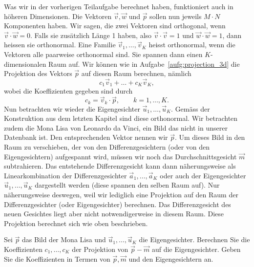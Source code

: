 Was wir in der vorherigen Teilaufgabe berechnet haben, funktioniert auch in höheren Dimensionen.
Die Vektoren $\vec v,\vec w$ und $\vec p$ sollen nun jeweils $M\cdot N$ Komponenten haben.
Wir sagen, die zwei Vektoren sind orthogonal, wenn $\vec v\cdot\vec w=0$.
Falls sie zusätzlich Länge 1 haben, also $\vec v\cdot\vec v=1$ und $\vec w\cdot\vec w=1$, dann heissen sie orthonormal.
Eine Familie $\vec v_1,\ldots,\vec v_K$ heisst orthonormal, wenn die Vektoren alle paarweise orthonormal sind.
Sie spannen dann einen $K$-dimensionalen Raum auf.
Wir können wie in Aufgabe~\ref{aufg:projection_3d} die Projektion des Vektors $\vec p$ auf diesen Raum berechnen, nämlich
\begin{equation*}
	c_1\vec v_1+\ldots+c_K\vec v_K,
\end{equation*}
wobei die Koeffizienten gegeben sind durch
\begin{equation*}
	c_k=\vec v_k\cdot\vec p,\qquad k=1,\ldots,K.
\end{equation*}
Nun betrachten wir wieder die Eigengesichter $\vec u_1,\ldots,\vec u_K$.
Gemäss der Konstruktion aus dem letzten Kapitel sind diese orthonormal.
Wir betrachten zudem die Mona Lisa von Leonardo da Vinci, ein Bild das nicht in unserer Datenbank ist.
Den entsprechenden Vektor nennen wir $\vec p$.
Um dieses Bild in den Raum zu verschieben, der von den Differenzgesichtern (oder von den Eigengesichtern) aufgespannt wird, müssen wir noch das Durchschnittsgesicht $\vec m$ subtrahieren.
Das entstehende Differenzgesicht kann dann näherungsweise als Linearkombination der Differenzgesichter $\vec a_1,\ldots,\vec a_K$ oder auch der Eigengesichter $\vec u_1,\ldots,\vec u_K$ dargestellt werden (diese spannen den selben Raum auf).
Nur näherungsweise deswegen, weil wir lediglich eine Projektion auf den Raum der Differenzgesichter (oder Eigengesichter) berechnen.
Das Differenzgesicht des neuen Gesichtes liegt aber nicht notwendigerweise in diesem Raum.
Diese Projektion berechnet sich wie oben beschrieben.
\begin{aufgabe} \label{aufg:projection}
	Sei $\vec p$ das Bild der Mona Lisa und $\vec u_1,\ldots,\vec u_K$ die Eigengesichter.
	Berechnen Sie die Koeffizienten $c_1,\ldots,c_K$ der Projektion von $\vec p-\vec m$ auf die Eigengesichter.
	Geben Sie die Koeffizienten in Termen von $\vec p,\vec m$ und den Eigengesichtern an.
\end{aufgabe}
